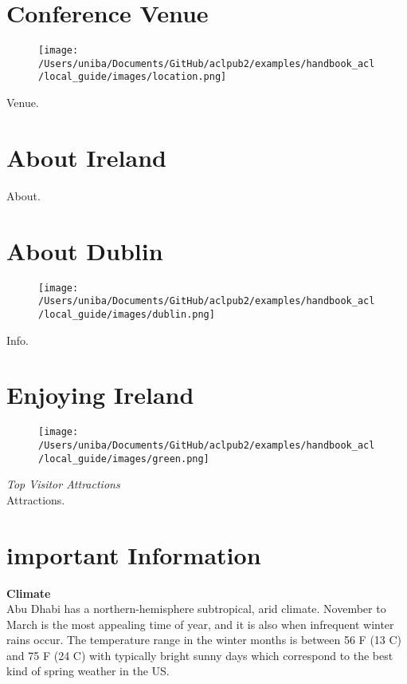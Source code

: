 \section{Conference Venue}

 \begin{figure}[h!]
  \centering
      \texttt{[image: /Users/uniba/Documents/GitHub/aclpub2/examples/handbook\_acl/local\_guide/images/location.png]}
 \end{figure}

Venue.
\section{About Ireland}

About.
\section{About Dublin}

 \begin{figure}[h!]
  \centering
      \texttt{[image: /Users/uniba/Documents/GitHub/aclpub2/examples/handbook\_acl/local\_guide/images/dublin.png]}
 \end{figure}
 \leavevmode\newline

Info. \\

\section{Enjoying Ireland}

 \begin{figure}[h!]
  \centering
      \texttt{[image: /Users/uniba/Documents/GitHub/aclpub2/examples/handbook\_acl/local\_guide/images/green.png]}
 \end{figure}
 \leavevmode\newline

{\Large \textit{Top Visitor Attractions}}\\
Attractions. \\


 \leavevmode\newline
\section{important Information}

{\large \textbf{Climate}}\\
Abu Dhabi has a northern-hemisphere subtropical, arid climate. November to March is the most appealing time of year, and it is also when infrequent winter rains occur.
The temperature range in the winter months is between 56 F (13 C) and 75 F (24 C) with typically bright sunny days which correspond to the best kind of spring weather in the US.\\

